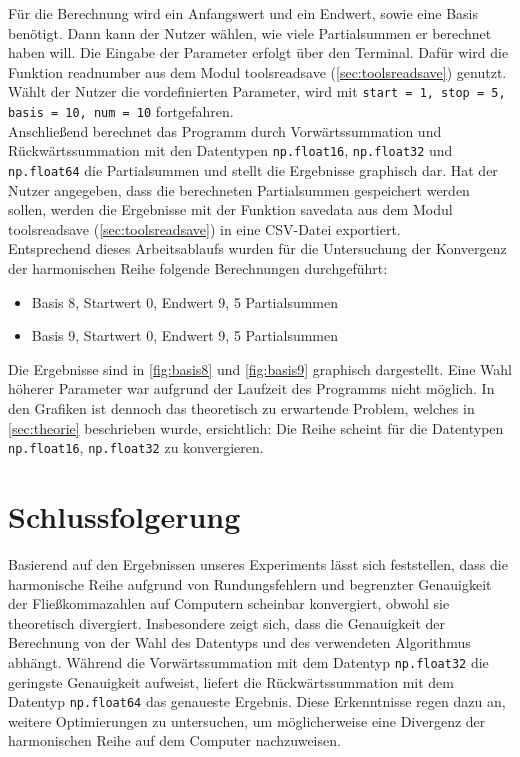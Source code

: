\documentclass{scrreprt}
\begin{document}
\noindent Für die Berechnung wird ein Anfangswert und ein Endwert, sowie eine Basis benötigt. Dann kann der Nutzer wählen, wie viele Partialsummen er berechnet haben will. Die Eingabe der Parameter erfolgt über den Terminal. Dafür wird die Funktion read\textunderscore number aus dem Modul tools\textunderscore read\textunderscore save (\autoref{sec:toolsreadsave}) genutzt. Wählt der Nutzer die vordefinierten Parameter, wird mit \texttt{start = 1, stop = 5, basis = 10, num = 10} fortgefahren. \\

\noindent Anschließend berechnet das Programm durch Vorwärtssummation und Rückwärtssummation mit den Datentypen \texttt{np.float16}, \texttt{np.float32} und \texttt{np.float64} die Partialsummen und stellt die Ergebnisse graphisch dar. Hat der Nutzer angegeben, dass die berechneten Partialsummen gespeichert werden sollen, werden die Ergebnisse mit der Funktion  save\textunderscore data aus dem Modul tools\textunderscore read\textunderscore save (\autoref{sec:toolsreadsave}) in eine CSV-Datei exportiert. \\

\noindent Entsprechend dieses Arbeitsablaufs wurden für die Untersuchung der Konvergenz der harmonischen Reihe folgende Berechnungen durchgeführt: 

\begin{itemize}
    \item Basis 8, Startwert 0, Endwert 9, 5 Partialsummen
    \item Basis 9, Startwert 0, Endwert 9, 5 Partialsummen
\end{itemize}

\noindent Die Ergebnisse sind in \autoref{fig:basis8} und \autoref{fig:basis9} graphisch dargestellt. Eine Wahl höherer Parameter war aufgrund der Laufzeit des Programms nicht möglich. In den Grafiken ist dennoch das theoretisch zu erwartende Problem, welches in \autoref{sec:theorie} beschrieben wurde, ersichtlich: Die Reihe scheint für die Datentypen \texttt{np.float16}, \texttt{np.float32} zu konvergieren.

\section{Schlussfolgerung}
Basierend auf den Ergebnissen unseres Experiments lässt sich feststellen, dass die harmonische Reihe aufgrund von Rundungsfehlern und begrenzter Genauigkeit der Fließkommazahlen auf Computern scheinbar konvergiert, obwohl sie theoretisch divergiert. Insbesondere zeigt sich, dass die Genauigkeit der Berechnung von der Wahl des Datentyps und des verwendeten Algorithmus abhängt. Während die Vorwärtssummation mit dem Datentyp \texttt{np.float32} die geringste Genauigkeit aufweist, liefert die Rückwärtssummation mit dem Datentyp \texttt{np.float64} das genaueste Ergebnis. Diese Erkenntnisse regen dazu an, weitere Optimierungen zu untersuchen, um möglicherweise eine Divergenz der harmonischen Reihe auf dem Computer nachzuweisen.
\end{document}
